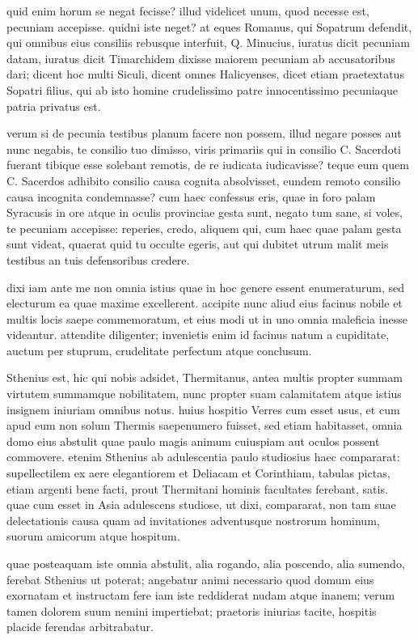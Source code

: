  quid enim horum se negat fecisse? illud videlicet unum, quod necesse est, pecuniam accepisse. quidni iste neget? at eques Romanus, qui Sopatrum defendit, qui omnibus eius consiliis rebusque interfuit, Q. Minucius, iuratus dicit pecuniam datam, iuratus dicit Timarchidem dixisse maiorem pecuniam ab accusatoribus dari; dicent hoc multi Siculi, dicent omnes Halicyenses, dicet etiam praetextatus Sopatri filius, qui ab isto homine crudelissimo patre innocentissimo pecuniaque patria privatus est.

 verum si de pecunia testibus planum facere non possem, illud negare posses aut nunc negabis, te consilio tuo dimisso, viris primariis qui in consilio C. Sacerdoti fuerant tibique esse solebant remotis, de re iudicata iudicavisse? teque eum quem C. Sacerdos adhibito consilio causa cognita absolvisset, eundem remoto consilio causa incognita condemnasse? cum haec confessus eris, quae in foro palam Syracusis in ore atque in oculis provinciae gesta sunt, negato tum sane, si voles, te pecuniam accepisse: reperies, credo, aliquem qui, cum haec quae palam gesta sunt videat, quaerat quid tu occulte egeris, aut qui dubitet utrum malit meis testibus an tuis defensoribus credere.

 dixi iam ante me non omnia istius quae in hoc genere essent enumeraturum, sed electurum ea quae maxime excellerent. accipite nunc aliud eius facinus nobile et multis locis saepe commemoratum, et eius modi ut in uno omnia maleficia inesse videantur. attendite diligenter; invenietis enim id facinus natum a cupiditate, auctum per stuprum, crudelitate perfectum atque conclusum.

 Sthenius est, hic qui nobis adsidet, Thermitanus, antea multis propter summam virtutem summamque nobilitatem, nunc propter suam calamitatem atque istius insignem iniuriam omnibus notus. huius hospitio Verres cum esset usus, et cum apud eum non solum Thermis saepenumero fuisset, sed etiam habitasset, omnia domo eius abstulit quae paulo magis animum cuiuspiam aut oculos possent commovere. etenim Sthenius ab adulescentia paulo studiosius haec compararat: supellectilem ex aere elegantiorem et Deliacam et Corinthiam, tabulas pictas, etiam argenti bene facti, prout Thermitani hominis facultates ferebant, satis. quae cum esset in Asia adulescens studiose, ut dixi, compararat, non tam suae delectationis causa quam ad invitationes adventusque nostrorum hominum, suorum amicorum atque hospitum.

 quae posteaquam iste omnia abstulit, alia rogando, alia poscendo, alia sumendo, ferebat Sthenius ut poterat; angebatur animi necessario quod domum eius exornatam et instructam fere iam iste reddiderat nudam atque inanem; verum tamen dolorem suum nemini impertiebat; praetoris iniurias tacite, hospitis placide ferendas arbitrabatur.

